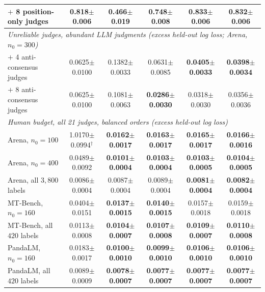 \begin{table}[!t]
{\begin{tabular}{lccccc}
\quad $+$ 8 position-only judges & 0.818{\scriptsize$\pm$0.006} & 0.466{\scriptsize$\pm$0.019} & 0.748{\scriptsize$\pm$0.008} & \textbf{0.833{\scriptsize$\pm$0.006}} & \textbf{0.832{\scriptsize$\pm$0.006}} \\
\midrule
\multicolumn{6}{l}{\emph{Unreliable judges, abundant LLM judgments (excess held-out log loss; Arena, $n_0=300$)}} \\
\quad $+$ 4 anti-consensus judges & 0.0625{\scriptsize$\pm$0.0100} & 0.1382{\scriptsize$\pm$0.0033} & 0.0631{\scriptsize$\pm$0.0085} & \textbf{0.0405{\scriptsize$\pm$0.0033}} & \textbf{0.0398{\scriptsize$\pm$0.0034}} \\
\quad $+$ 8 anti-consensus judges & 0.0625{\scriptsize$\pm$0.0100} & 0.1081{\scriptsize$\pm$0.0063} & \textbf{0.0286{\scriptsize$\pm$0.0030}} & 0.0318{\scriptsize$\pm$0.0030} & 0.0356{\scriptsize$\pm$0.0036} \\
\midrule
\multicolumn{6}{l}{\emph{Human budget, all 21 judges, balanced orders (excess held-out log loss)}} \\
\quad Arena, $n_0=100$ & 1.0170{\scriptsize$\pm$0.0994}$^\dagger$ & \textbf{0.0162{\scriptsize$\pm$0.0017}} & \textbf{0.0163{\scriptsize$\pm$0.0017}} & \textbf{0.0165{\scriptsize$\pm$0.0017}} & \textbf{0.0166{\scriptsize$\pm$0.0016}} \\
\quad Arena, $n_0=400$ & 0.0489{\scriptsize$\pm$0.0092} & \textbf{0.0101{\scriptsize$\pm$0.0004}} & \textbf{0.0103{\scriptsize$\pm$0.0004}} & \textbf{0.0103{\scriptsize$\pm$0.0005}} & \textbf{0.0104{\scriptsize$\pm$0.0005}} \\
\quad Arena, all $3{,}800$ labels & 0.0086{\scriptsize$\pm$0.0004} & 0.0087{\scriptsize$\pm$0.0004} & 0.0089{\scriptsize$\pm$0.0004} & \textbf{0.0081{\scriptsize$\pm$0.0004}} & \textbf{0.0082{\scriptsize$\pm$0.0004}} \\
\quad MT-Bench, $n_0=160$ & 0.0404{\scriptsize$\pm$0.0151} & \textbf{0.0137{\scriptsize$\pm$0.0015}} & \textbf{0.0140{\scriptsize$\pm$0.0015}} & 0.0157{\scriptsize$\pm$0.0018} & 0.0159{\scriptsize$\pm$0.0018} \\
\quad MT-Bench, all $420$ labels & 0.0113{\scriptsize$\pm$0.0008} & \textbf{0.0104{\scriptsize$\pm$0.0007}} & \textbf{0.0107{\scriptsize$\pm$0.0008}} & \textbf{0.0109{\scriptsize$\pm$0.0007}} & \textbf{0.0110{\scriptsize$\pm$0.0008}} \\
\quad PandaLM, $n_0=160$ & 0.0183{\scriptsize$\pm$0.0017} & \textbf{0.0100{\scriptsize$\pm$0.0010}} & \textbf{0.0099{\scriptsize$\pm$0.0010}} & \textbf{0.0106{\scriptsize$\pm$0.0010}} & \textbf{0.0106{\scriptsize$\pm$0.0010}} \\
\quad PandaLM, all $420$ labels & 0.0089{\scriptsize$\pm$0.0009} & \textbf{0.0078{\scriptsize$\pm$0.0007}} & \textbf{0.0077{\scriptsize$\pm$0.0007}} & \textbf{0.0077{\scriptsize$\pm$0.0007}} & \textbf{0.0077{\scriptsize$\pm$0.0007}} \\
\bottomrule
\end{tabular}}
\end{table}
